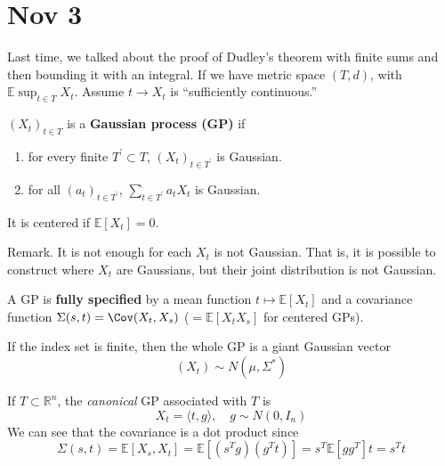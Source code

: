 \section{Nov 3} 

	Last time, we talked about the proof of Dudley's theorem with finite sums and then bounding it with an integral. If we have metric space $(T, d)$, with $\mathbb{E} \sup_{t \in T} X_t$. Assume $t \to X_t$ is ``sufficiently continuous.'' 

	\begin{definition}
		$(X_t)_{t \in T}$ is a \textbf{Gaussian process (GP)} if 
		\begin{enumerate}
		  \item for every finite $T^\prime \subset T$, $(X_t)_{t \in T^\prime}$ is Gaussian. 
			\item for all $(a_t)_{t \in T^\prime}$, $\sum_{t \in T^\prime} a_t X_t$ is Gaussian. 
		\end{enumerate}
		It is centered if $\mathbb{E}[X_t] = 0$. 
	\end{definition}

	Remark. It is not enough for each $X_t$ is not Gaussian. That is, it is possible to construct where $X_t$ are Gaussians, but their joint distribution is not Gaussian. 

	\begin{lemma}
		A GP is \textbf{fully specified} by a mean function $t \mapsto \mathbb{E}[X_t]$ and a covariance function $\Sigma(s, t) = \Cov(X_t, X_s)$ ($ = \mathbb{E}[X_t X_s]$ for centered GPs). 
	\end{lemma}

	\begin{example}
	  If the index set is finite, then the whole GP is a giant Gaussian vector 
		\begin{equation}
			(X_t) \sim N(\mu, \Sigma^\ast)
		\end{equation} 
	\end{example}

	\begin{example}
		If $T \subset \mathbb{R}^n$, the \textit{canonical} GP associated with $T$ is 
		\begin{equation}
		  X_t = \langle t, g \rangle, \quad g \sim N(0, I_n)
		\end{equation}
		We can see that the covariance is a dot product since 
		\begin{equation}
			\Sigma(s, t) = \mathbb{E}[X_s, X_t] = \mathbb{E}[(s^T g) (g^T t)] = s^T \mathbb{E}[g g^T] t = s^T t
		\end{equation}
	\end{example}

